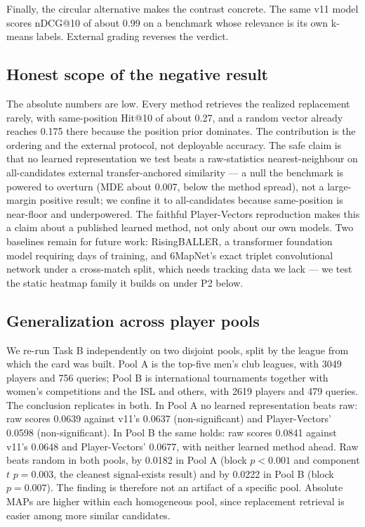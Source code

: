 Finally, the circular alternative makes the contrast concrete. The same v11
model scores nDCG@10 of about 0.99 on a benchmark whose relevance is its own
k-means labels. External grading reverses the verdict.

\subsection{Honest scope of the negative result}
\label{sec:scoutbench-scope}

The absolute numbers are low. Every method retrieves the realized replacement
rarely, with same-position Hit@10 of about 0.27, and a random vector already
reaches 0.175 there because the position prior dominates. The contribution is
the ordering and the external protocol, not deployable accuracy. The safe claim
is that no learned representation we test beats a raw-statistics
nearest-neighbour on all-candidates external transfer-anchored similarity --- a
null the benchmark is powered to overturn (MDE about 0.007, below the method
spread), not a large-margin positive result; we confine it to all-candidates
because same-position is near-floor and underpowered. The faithful
Player-Vectors reproduction makes this a claim about a published learned method,
not only about our own models. Two baselines remain for future work:
RisingBALLER, a transformer foundation model requiring days of training, and
6MapNet's exact triplet convolutional network under a cross-match split, which
needs tracking data we lack --- we test the static heatmap family it builds on
under P2 below.

\subsection{Generalization across player pools}
\label{sec:scoutbench-generalization}

We re-run Task B independently on two disjoint pools, split by the league from
which the card was built. Pool A is the top-five men's club leagues, with 3049
players and 756 queries; Pool B is international tournaments together with
women's competitions and the ISL and others, with 2619 players and 479
queries. The conclusion replicates in both. In Pool A no learned
representation beats raw: raw scores 0.0639 against v11's 0.0637
(non-significant) and Player-Vectors' 0.0598 (non-significant). In Pool B the
same holds: raw scores 0.0841 against v11's 0.0648 and Player-Vectors' 0.0677,
with neither learned method ahead. Raw beats random in both pools, by 0.0182 in
Pool A (block $p < 0.001$ and component $t$ $p = 0.003$, the cleanest
signal-exists result) and by 0.0222 in Pool B (block $p = 0.007$). The finding
is therefore not an artifact of a specific pool. Absolute MAPs are higher
within each homogeneous pool, since replacement retrieval is easier among more
similar candidates.

